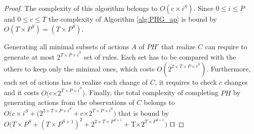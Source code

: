 \begin{theorem}[Complexity]
\begin{proof}
		The complexity of this algorithm belongs to $O(c\times i^S)$.
		Since $0 \leq i \leq P$ and $0 \leq c \leq T$ the complexity of Algorithm \ref{alg:PHG_ap} is bound by $O(T\times P^S) = (T\times P^S)$.
		
		Generating all minimal subsets of actions $A$ of $PH'$ that realize $C$ can require to generate at most $2^{T\times  P \times  i^S}$ set of rules.
		Each set has to be compared with the others to keep only the minimal ones, which costs $O(2^{2\times T\times  P \times  i^S})$.
		Furthermore, each set of actions has to realize each change of $C$, it requires to check $c$ changes and it costs $O($c$ \times  2^{T\times  P \times  i^S})$.
		Finally, the total complexity of completing $PH$ by generating actions from the observations of $C$ belongs to
		$O(c\times i^S + (2^{2\times T\times  P \times  i^S} + $c$ \times  2^{T\times  P \times  i^S})$ that is bound by $O(T\times P^S + (T\times P^{S+1})^2 + 2^{2\times T\times P^{S+1}} + $T$ \times  2^{T\times  P^{S+1}})$
		$\qed$
	\end{proof}
\end{theorem}


%
